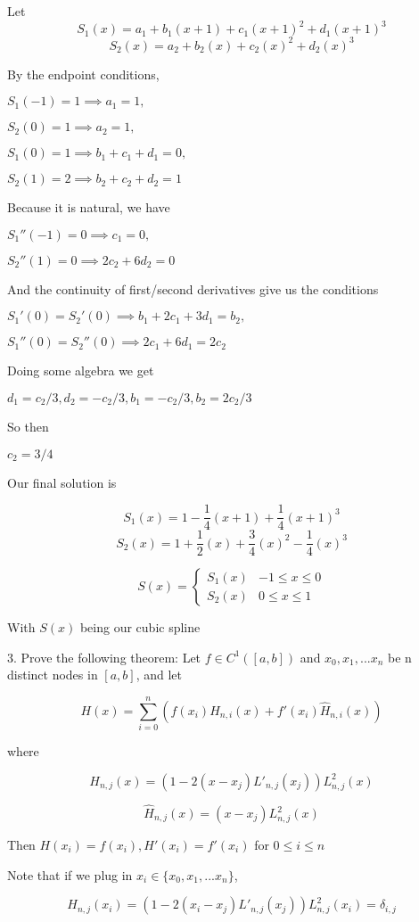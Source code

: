 \documentclass{article}
\begin{document}
Let 
$$S_1(x) =a_1+b_1(x+1)+c_1(x+1)^2+d_1(x+1)^3$$
$$S_2(x) =a_2+b_2(x)+c_2(x)^2+d_2(x)^3$$

By the endpoint conditions, 

$S_1(-1) = 1 \implies a_1 = 1,$

$S_2(0) = 1 \implies a_2 = 1,$

$S_1(0) = 1 \implies b_1+c_1+d_1 = 0,$

$S_2(1) = 2 \implies  b_2+c_2+d_2 = 1$

Because it is natural, we have 

$S_1''(-1) = 0 \implies c_1 = 0,$

$S_2''(1) = 0 \implies 2c_2 + 6d_2= 0$

And the continuity of first/second derivatives give us the conditions

$S_1'(0) = S_2'(0) \implies b_1 + 2c_1 + 3d_1 = b_2,$

$S_1''(0) = S_2''(0) \implies 2c_1 + 6d_1 = 2c_2$

Doing some algebra we get 

$d_1 = c_2/3,  d_2 = -c_2/3, b_1 = -c_2/3, b_2 = 2c_2/3$

So then 

$c_2 = 3/4$

Our final solution is 

$$S_1(x) = 1-\frac{1}{4}(x+1)+\frac{1}{4}(x+1)^3$$
$$S_2(x) = 1+\frac{1}{2}(x)+\frac{3}{4}(x)^2-\frac{1}{4}(x)^3$$


\[ S(x) = \begin{cases} 
      S_1(x) & -1\leq x\leq 0\\
      S_2(x) & 0\leq x\leq 1
   \end{cases}
\]

With $S(x)$ being our cubic spline

3. Prove the following theorem: Let $f \in C^1([a, b])$ and $x_0, x_1, ...x_n$ be n distinct nodes in $[a, b]$, and let

$$H(x)= \sum_{i=0}^n ( f(x_i)H_{n,i}(x) + f'(x_i )\hat{H}_{n,i}(x) )$$

where 

$$H_{n,j}(x) = (1-2(x-x_j)L'_{n,j}(x_j))L^2_{n,j}(x)$$

$$\hat{H}_{n,j}(x) = (x-x_j)L^2_{n,j}(x)$$

Then $H(x_i) = f(x_i), H'(x_i) = f'(x_i)$ for $0 \le i \le n$

Note that if we plug in $x_i \in \{x_0, x_1, ...x_n\}$, 

$$H_{n,j}(x_i) = (1-2(x_i-x_j)L'_{n,j}(x_j))L^2_{n,j}(x_i) = \delta_{i,j}$$
\end{document}
